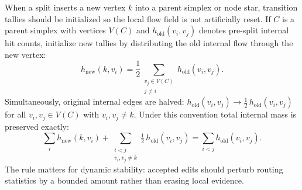 \documentclass[11pt]{article}
\begin{document}
When a split inserts a new vertex $k$ into a parent simplex or node star, transition tallies should be initialized so the local flow field is not artificially reset. If $C$ is a parent simplex with vertices $V(C)$ and $h_{\mathrm{old}}(v_i,v_j)$ denotes pre-split internal hit counts, initialize new tallies by distributing the old internal flow through the new vertex:
\[
h_{\mathrm{new}}(k,v_i)
=\frac12\sum_{\substack{v_j\in V(C)\\j\ne i}}h_{\mathrm{old}}(v_i,v_j).
\]
Simultaneously, original internal edges are halved: $h_{\mathrm{old}}(v_i,v_j)\to\tfrac12\,h_{\mathrm{old}}(v_i,v_j)$ for all $v_i,v_j\in V(C)$ with $v_i,v_j\ne k$. Under this convention total internal mass is preserved exactly:
\[
\sum_i h_{\mathrm{new}}(k,v_i)
+\!\!\sum_{\substack{i<j\\v_i,v_j\ne k}}\tfrac12\,h_{\mathrm{old}}(v_i,v_j)
=\sum_{i<j}h_{\mathrm{old}}(v_i,v_j).
\]
The rule matters for dynamic stability: accepted edits should perturb routing statistics by a bounded amount rather than erasing local evidence.
\end{document}
